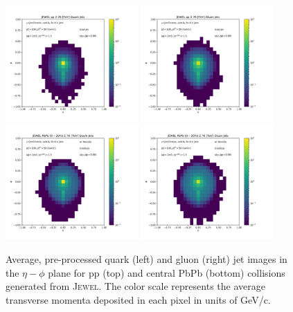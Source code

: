 \documentclass[notoc,preprintnumbers]{JHEP3}
\begin{document}
\begin{figure}[t]
\centering
\includegraphics[width=0.45\textwidth]{plots/JEWEL_pp_2p76TeV_AverageQuarkJet_Ypt100_jpt50.pdf}
\includegraphics[width=0.45\textwidth]{plots/JEWEL_pp_2p76TeV_AverageGluonJet_Ypt100_jpt50.pdf}
\includegraphics[width=0.45\textwidth]{plots/JEWEL_pbpb020_2p76TeV_AverageQuarkJet_Ypt100_jpt50.pdf}
\includegraphics[width=0.45\textwidth]{plots/JEWEL_pbpb020_2p76TeV_AverageGluonJet_Ypt100_jpt50.pdf}
\caption{Average, pre-processed quark (left) and gluon (right) jet images in the $\eta-\phi$ plane for pp (top) and central PbPb (bottom) collisions generated from \textsc{Jewel}. The color scale represents the average transverse momenta deposited in each pixel in units of GeV/c. }
\label{fig:qgjetimages}
\end{figure}
\end{document}
